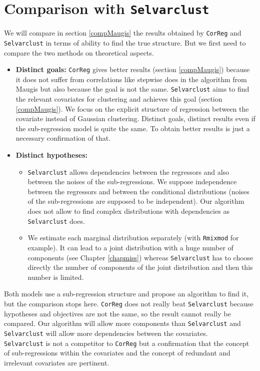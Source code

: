 \documentclass[12pt,a4paper]{report}
\begin{document}
\section{Comparison with {\tt Selvarclust}}\label{compMaugisth}
We will compare in section \ref{compMaugis} the results obtained by {\tt CorReg} and {\tt Selvarclust} in terms of ability to find the true structure. But we first need to compare the two methods on theoretical aspects.
\begin{itemize}
	\item \textbf{Distinct goals:} {\tt CorReg} gives better results (section \ref{compMaugis}) because it does not suffer from correlations like stepwise does in the algorithm from Maugis but also because the goal is not the same. {\tt Selvarclust} aims to find the relevant covariates for clustering and achieves this goal (section \ref{compMaugis}). We focus on the explicit structure of regression between the covariate instead of Gaussian clustering. Distinct goals, distinct results even if the sub-regression model is quite the same. To obtain better results is just a necessary confirmation of that.
	\item \textbf{Distinct hypotheses:}  
	\begin{itemize}
		\item {\tt Selvarclust} allows dependencies between the regressors and also between the noises of the sub-regressions. We suppose independence between the regressors and between the conditional distributions (noises of the sub-regressions are supposed to be independent). %
		 Our algorithm does not allow to find complex distributions with dependencies as {\tt Selvarclust} does. 
		\item We estimate each marginal distribution separately (with {\tt Rmixmod} for example). It can lead to a joint distribution with a huge number of components (see Chapter \ref{chapmiss}) whereas {\tt Selvarclust} has to choose directly the number of components of the joint distribution and then this number is limited.
	\end{itemize} 
\end{itemize}	 	 
	  Both models use a sub-regression structure and propose an algorithm to find it, but the comparison stops here. {\tt CorReg} does not really beat {\tt Selvarclust} because hypotheses and objectives are not the same,  so the result cannot really be compared. Our algorithm will allow more components than {\tt Selvarclust} and {\tt Selvarclust} will allow more dependencies between the covariates.\\
	  {\tt Selvarclust} is not a competitor to {\tt CorReg} but a confirmation that the concept of sub-regressions within the covariates and the concept of redundant and irrelevant covariates are pertinent.
			
\end{document}
